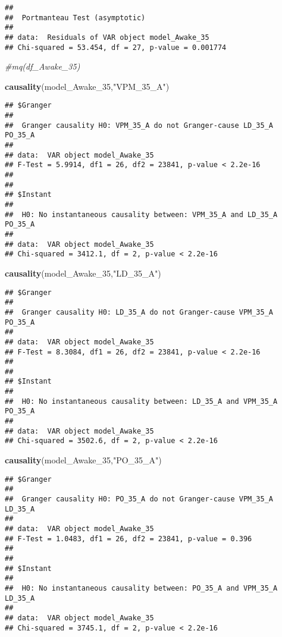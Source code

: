 \documentclass[
]{article}
\newenvironment{Shaded}{\begin{snugshade}}{\end{snugshade}}
\newcommand{\CommentTok}[1]{\textcolor[rgb]{0.56,0.35,0.01}{\textit{#1}}}
\newcommand{\FunctionTok}[1]{\textcolor[rgb]{0.13,0.29,0.53}{\textbf{#1}}}
\newcommand{\NormalTok}[1]{#1}
\newcommand{\StringTok}[1]{\textcolor[rgb]{0.31,0.60,0.02}{#1}}
\begin{document}
\begin{verbatim}
## 
##  Portmanteau Test (asymptotic)
## 
## data:  Residuals of VAR object model_Awake_35
## Chi-squared = 53.454, df = 27, p-value = 0.001774
\end{verbatim}

\begin{Shaded}
\begin{Highlighting}[]
\CommentTok{\#mq(df\_Awake\_35)}

\FunctionTok{causality}\NormalTok{(model\_Awake\_35,}\StringTok{"VPM\_35\_A"}\NormalTok{)}
\end{Highlighting}
\end{Shaded}

\begin{verbatim}
## $Granger
## 
##  Granger causality H0: VPM_35_A do not Granger-cause LD_35_A PO_35_A
## 
## data:  VAR object model_Awake_35
## F-Test = 5.9914, df1 = 26, df2 = 23841, p-value < 2.2e-16
## 
## 
## $Instant
## 
##  H0: No instantaneous causality between: VPM_35_A and LD_35_A PO_35_A
## 
## data:  VAR object model_Awake_35
## Chi-squared = 3412.1, df = 2, p-value < 2.2e-16
\end{verbatim}

\begin{Shaded}
\begin{Highlighting}[]
\FunctionTok{causality}\NormalTok{(model\_Awake\_35,}\StringTok{"LD\_35\_A"}\NormalTok{)}
\end{Highlighting}
\end{Shaded}

\begin{verbatim}
## $Granger
## 
##  Granger causality H0: LD_35_A do not Granger-cause VPM_35_A PO_35_A
## 
## data:  VAR object model_Awake_35
## F-Test = 8.3084, df1 = 26, df2 = 23841, p-value < 2.2e-16
## 
## 
## $Instant
## 
##  H0: No instantaneous causality between: LD_35_A and VPM_35_A PO_35_A
## 
## data:  VAR object model_Awake_35
## Chi-squared = 3502.6, df = 2, p-value < 2.2e-16
\end{verbatim}

\begin{Shaded}
\begin{Highlighting}[]
\FunctionTok{causality}\NormalTok{(model\_Awake\_35,}\StringTok{"PO\_35\_A"}\NormalTok{)}
\end{Highlighting}
\end{Shaded}

\begin{verbatim}
## $Granger
## 
##  Granger causality H0: PO_35_A do not Granger-cause VPM_35_A LD_35_A
## 
## data:  VAR object model_Awake_35
## F-Test = 1.0483, df1 = 26, df2 = 23841, p-value = 0.396
## 
## 
## $Instant
## 
##  H0: No instantaneous causality between: PO_35_A and VPM_35_A LD_35_A
## 
## data:  VAR object model_Awake_35
## Chi-squared = 3745.1, df = 2, p-value < 2.2e-16
\end{verbatim}
\end{document}
